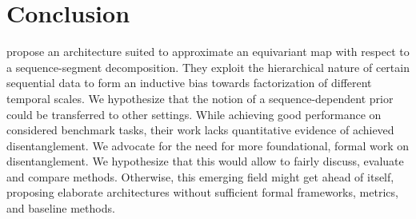 \documentclass{article} %
\begin{document}
\section*{Conclusion}
\citet{hsu2017unsupervised} propose an architecture suited to approximate an equivariant map with respect to a sequence-segment decomposition. They exploit the hierarchical nature of certain sequential data to form an inductive bias towards factorization of different temporal scales. We hypothesize that the notion of a sequence-dependent prior could be transferred to other settings. While achieving good performance on considered benchmark tasks, their work lacks quantitative evidence of achieved disentanglement.
We advocate for the need for more foundational, formal work on disentanglement. We hypothesize that this would allow to fairly discuss, evaluate and compare methods. Otherwise, this emerging field might get ahead of itself, proposing elaborate architectures without sufficient formal frameworks, metrics, and baseline methods. 



\newpage


\end{document}
